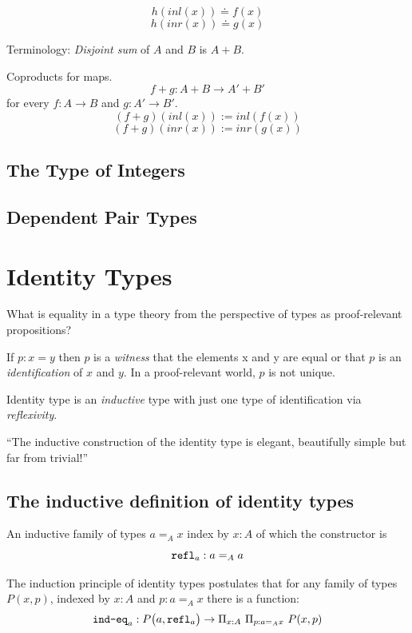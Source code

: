 \documentclass{article}
\begin{document}
\[h (inl(x)) \doteq f(x) \]
\[h (inr(x)) \doteq g(x) \]

Terminology: \emph{Disjoint sum} of $A$ and $B$ is $A + B$.

\begin{remark}
  Coproducts for maps.
  \[ f + g : A + B \to A' + B' \]
  for every $f : A \to B$ and $g : A' \to B'$.
  \[(f + g) (inl(x)) := inl(f(x)) \]
  \[(f + g) (inr(x)) := inr(g(x)) \]
\end{remark}

\subsection{The Type of Integers}
\subsection{Dependent Pair Types}

\section{Identity Types}
What is equality in a type theory from the perspective of types as
proof-relevant propositions?

If $p : x = y$ then $p$ is a \emph{witness} that the elements x and y
are equal or that $p$ is an \emph{identification} of $x$ and $y$.
In a proof-relevant world, $p$ is not unique.

Identity type is an \emph{inductive} type with just one type of
identification via \emph{reflexivity}.

``The inductive construction of the identity type is elegant,
beautifully simple but far from trivial!''



\subsection{The inductive definition of identity types}

\begin{definition}
  An inductive family of types $a =_A x$ index by $x : A$ of which the
  constructor is \[ \texttt{refl}_{a} : {a =_A a} \]
\end{definition}
The induction principle of identity types postulates that for any
family of types $P(x, p)$, indexed by $x : A$ and $p : a =_A x $ there
is a function:
\[
\texttt{ind-eq}_{a} : P \big( a , \texttt{refl}_{a} \big) \to \Pi_{x : A}~ {\Pi_{p : a =_A x}~ {P(x, p)}}
\]
\end{document}
